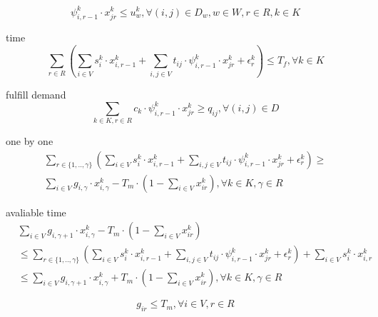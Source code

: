 \documentclass[preprint,12pt,authoryear]{elsarticle}
\begin{document}
\begin{equation}
    \psi_{i,r-1}^k \cdot x_{jr}^k\leq u_w^k, \forall (i,j)\in D_w, w\in W, r\in R, k\in K
\label{cc}
\end{equation}

time
\begin{equation}
    \sum_{r\in R}{(
        \sum_{i\in V}{s_i^k\cdot x_{i,r-1}^k}
        +\sum_{i,j\in V}{t_{ij}\cdot \psi_{i,r-1}^k\cdot x_{jr}^k}
        +\epsilon_r^k
    )}
    \leq T_f,
    \forall k\in K
\label{tm}
\end{equation}

fulfill demand
\begin{equation}
    \sum_{k\in K,r\in R}{c_k\cdot \psi_{i,r-1}^k\cdot x_{jr}^k}\geq q_{ij}, \forall (i,j)\in D
\label{fd}
\end{equation}

one by one
\begin{equation}
    \begin{split}
        \sum_{r\in \{1,..,\gamma\}}{(
            \sum_{i\in V}{s_i^k\cdot x_{i,r-1}^k}
            +\sum_{i,j\in V}{t_{ij}\cdot \psi_{i,r-1}^k\cdot x_{jr}^k}
            +\epsilon_r^k
        )} \geq \\
        \sum_{i\in V}{g_{i,\gamma}\cdot x_{i,\gamma}^k}-T_m\cdot(1-\sum_{i\in V}{x_{ir}^k}),
        \forall k\in K,\gamma \in R
    \end{split}
\label{1b1}
\end{equation}

avaliable time
\begin{equation}
    \begin{split}
        &\sum_{i\in V}{g_{i,\gamma+1}\cdot x_{i,\gamma}^k}-T_m\cdot(1-\sum_{i\in V}{x_{ir}^k})\\
        &\leq \sum_{r\in \{1,..,\gamma\}}{(
            \sum_{i\in V}{s_i^k\cdot x_{i,r-1}^k}
            +\sum_{i,j\in V}{t_{ij}\cdot \psi_{i,r-1}^k\cdot x_{jr}^k}
            +\epsilon_r^k
        )} + \sum_{i\in V}{s_i^k\cdot x_{i,r}^k}\\
        &\leq \sum_{i\in V}{g_{i,\gamma+1}\cdot x_{i,\gamma}^k} + T_m\cdot(1-\sum_{i\in V}{x_{ir}^k}),
        \forall k\in K,\gamma \in R
    \end{split}
\label{avlt}
\end{equation}

\begin{equation}
    g_{ir}\leq T_m, \forall i\in V,r\in R
\label{mxms}
\end{equation}
\end{document}
